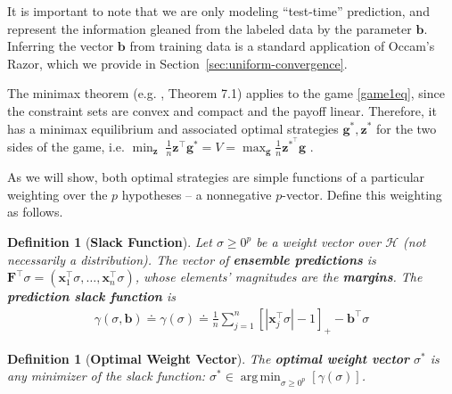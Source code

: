 \documentclass{colt2015} %
\newtheorem{defn}[thm]{Definition}
\newcommand{\vF}{\mathbf{F}}
\newcommand{\vx}{\mathbf{x}}
\newcommand{\vb}{\mathbf{b}}
\newcommand{\vg}{\mathbf{g}}
\newcommand{\vz}{\mathbf{z}}
\DeclareMathOperator*{\argmin}{arg\,min}
\newcommand{\abs}[1]{\left| #1 \right|}
\newcommand{\cH}{\mathcal{H}}
\begin{document}
It is important to note that we are only modeling ``test-time''
prediction, and represent the information gleaned from the labeled data
by the parameter $\vb$. Inferring the vector $\vb$ from training data
is a standard application of Occam's Razor, which we provide in
Section~\ref{sec:uniform-convergence}.

The minimax theorem (e.g. \cite{CBL06}, Theorem 7.1) applies to the game \eqref{game1eq}, 
since the constraint sets are convex and compact and the payoff linear. 
Therefore, it has a minimax equilibrium and associated optimal 
strategies $\vg^*, \vz^*$ for the two sides of the game, i.e. 
$\min_{\vz}\; \frac{1}{n} \vz^\top \vg^* = V = \max_{\vg} \frac{1}{n} \vz^{*^\top} \vg$ .

As we will show, both optimal strategies are simple functions of a
particular weighting over the $p$ hypotheses -- a nonnegative $p$-vector. 
Define this weighting as follows.
\begin{defn}[\textbf{Slack Function}]
Let $\sigma \geq 0^p$ be a weight vector over $\cH$ (not necessarily a distribution).
The vector of \textbf{ensemble predictions} is
$\vF^\top \sigma = (\vx_1^\top \sigma, \dots, \vx_n^\top \sigma)$, 
whose elements' magnitudes are the \textbf{margins}. 
The \textbf{prediction slack function} is
\begin{align}
\label{eqn:slack}
\gamma (\sigma, \vb) \doteq \gamma (\sigma) \doteq \frac{1}{n} \sum_{j=1}^n \left[ \abs{\vx_{j}^\top \sigma} - 1 \right]_{+} - \vb^\top \sigma
\end{align}
\end{defn}
\begin{defn}[\textbf{Optimal Weight Vector}]
The \textbf{optimal weight vector} $\sigma^*$ is any minimizer of the slack function: 
$\displaystyle \sigma^* \in \argmin_{\sigma \geq 0^p} \left[ \gamma (\sigma) \right]$.
\end{defn}
\end{document}
